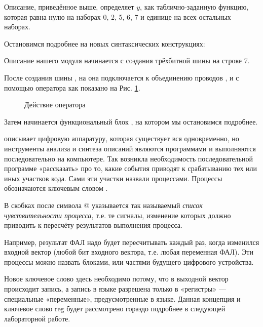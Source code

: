 

\par{Описание, приведённое выше, определяет $y$, как таблично-заданную функцию, которая равна нулю на наборах 0, 2, 5, 6, 7 и единице на всех остальных наборах.}

\par{Остановимся подробнее на новых синтаксических конструкциях:}
\par{Описание нашего модуля начинается с создания трёхбитной шины  на строке 7.}
\par{После создания шины , на она подключается к объединению проводов ,  и  с помощью оператора  как показано на Рис. \ref{fig:assign}.}

\begin{figure}[H]
  \centering
  \def\svgwidth{\columnwidth}
  
  \caption{Действие оператора }
  \label{fig:assign}
\end{figure}

\par{Затем начинается функциональный блок , на котором мы остановимся подробнее.}
\par{ описывает цифровую аппаратуру, которая существует вся одновременно, но инструменты анализа и синтеза описаний являются программами и выполняются последовательно на компьютере. Так возникла необходимость последовательной программе «рассказать» про то, какие события приводят к срабатыванию тех или иных участков кода. Сами эти участки назвали процессами. Процессы обозначаются ключевым словом .}

\par{В скобках после символа @ указывается так называемый \emph{список чувствительности процесса}, т.е. те сигналы, изменение которых должно приводить к пересчёту результатов выполнения процесса.}

\par{Например, результат ФАЛ надо будет пересчитывать каждый раз, когда изменился входной вектор (любой бит входного вектора, т.е. любая переменная ФАЛ). Эти процессы можно назвать блоками, или частями будущего цифрового устройства.}

\par{Новое ключевое слово  здесь необходимо потому, что в выходной вектор происходит запись, а запись в языке  разрешена только в «регистры» — специальные «переменные», предусмотренные в языке. Данная концепция и ключевое слово reg будет рассмотрено гораздо подробнее в следующей лабораторной работе.}

